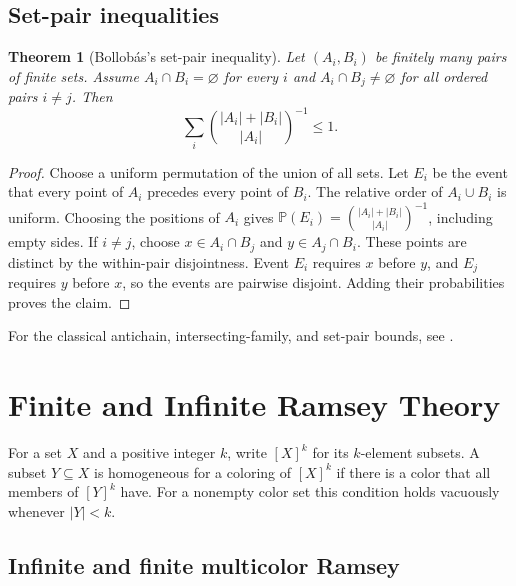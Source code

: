 \documentclass[11pt,oneside,openany]{book}
\theoremstyle{plain}
\newtheorem{theorem}{Theorem}[chapter]
\theoremstyle{definition}
\theoremstyle{remark}
\begin{document}
\section{Set-pair inequalities}

\begin{theorem}[Bollob\'as's set-pair inequality]\label{p205:W10}
Let \((A_i,B_i)\) be finitely many pairs of finite sets. Assume
\(A_i\cap B_i=\varnothing\) for every \(i\) and
\(A_i\cap B_j\ne\varnothing\) for all ordered pairs \(i\ne j\).
Then
\[
   \sum_i\binom{|A_i|+|B_i|}{|A_i|}^{-1}\le1.
\]
\end{theorem}
\begin{proof}
Choose a uniform permutation of the union of all sets. Let \(E_i\)
be the event that every point of \(A_i\) precedes every point of
\(B_i\). The relative order of \(A_i\cup B_i\) is uniform.
Choosing the positions of \(A_i\) gives
\(\mathbb P(E_i)=\binom{|A_i|+|B_i|}{|A_i|}^{-1}\), including empty
sides. If \(i\ne j\), choose \(x\in A_i\cap B_j\) and
\(y\in A_j\cap B_i\). These points are distinct by the within-pair
disjointness. Event \(E_i\) requires \(x\) before \(y\), and \(E_j\)
requires \(y\) before \(x\), so the events are pairwise disjoint.
Adding their probabilities proves the claim.
\end{proof}

For the classical antichain, intersecting-family, and set-pair
bounds, see \cite[Sections~7.2 and~8.3--8.4]{jukna}.
\chapter{Finite and Infinite Ramsey Theory}

For a set \(X\) and a positive integer \(k\), write \([X]^k\) for
its \(k\)-element subsets. A subset \(Y\subseteq X\) is homogeneous
for a coloring of \([X]^k\) if there is a color that all members of
\([Y]^k\) have. For a nonempty color set this condition holds
vacuously whenever \(|Y|<k\).

\section{Infinite and finite multicolor Ramsey}
\end{document}
